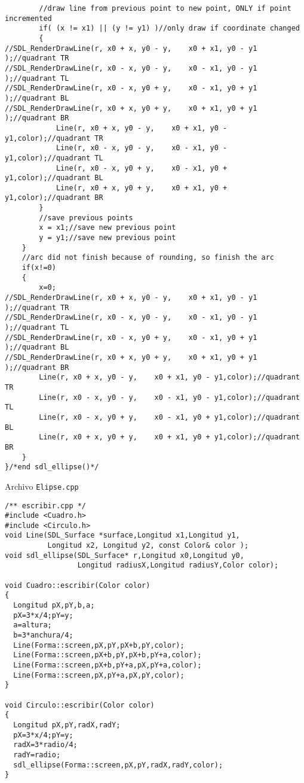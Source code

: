 \documentclass[11pt]{article}
\begin{document}
\begin{verbatim}
        //draw line from previous point to new point, ONLY if point incremented
        if( (x != x1) || (y != y1) )//only draw if coordinate changed
        {
//SDL_RenderDrawLine(r, x0 + x, y0 - y,    x0 + x1, y0 - y1 );//quadrant TR
//SDL_RenderDrawLine(r, x0 - x, y0 - y,    x0 - x1, y0 - y1 );//quadrant TL
//SDL_RenderDrawLine(r, x0 - x, y0 + y,    x0 - x1, y0 + y1 );//quadrant BL
//SDL_RenderDrawLine(r, x0 + x, y0 + y,    x0 + x1, y0 + y1 );//quadrant BR
            Line(r, x0 + x, y0 - y,    x0 + x1, y0 - y1,color);//quadrant TR
            Line(r, x0 - x, y0 - y,    x0 - x1, y0 - y1,color);//quadrant TL
            Line(r, x0 - x, y0 + y,    x0 - x1, y0 + y1,color);//quadrant BL
            Line(r, x0 + x, y0 + y,    x0 + x1, y0 + y1,color);//quadrant BR
        }
        //save previous points
        x = x1;//save new previous point
        y = y1;//save new previous point
    }
    //arc did not finish because of rounding, so finish the arc
    if(x!=0)
    {
        x=0;
//SDL_RenderDrawLine(r, x0 + x, y0 - y,    x0 + x1, y0 - y1 );//quadrant TR
//SDL_RenderDrawLine(r, x0 - x, y0 - y,    x0 - x1, y0 - y1 );//quadrant TL
//SDL_RenderDrawLine(r, x0 - x, y0 + y,    x0 - x1, y0 + y1 );//quadrant BL
//SDL_RenderDrawLine(r, x0 + x, y0 + y,    x0 + x1, y0 + y1 );//quadrant BR
        Line(r, x0 + x, y0 - y,    x0 + x1, y0 - y1,color);//quadrant TR
        Line(r, x0 - x, y0 - y,    x0 - x1, y0 - y1,color);//quadrant TL
        Line(r, x0 - x, y0 + y,    x0 - x1, y0 + y1,color);//quadrant BL
        Line(r, x0 + x, y0 + y,    x0 + x1, y0 + y1,color);//quadrant BR
    }
}/*end sdl_ellipse()*/
\end{verbatim}
\begin{center}
Archivo {\tt Elipse.cpp}
\end{center}
\begin{verbatim}
/** escribir.cpp */
#include <Cuadro.h>
#include <Circulo.h>
void Line(SDL_Surface *surface,Longitud x1,Longitud y1, 
          Longitud x2, Longitud y2, const Color& color );
void sdl_ellipse(SDL_Surface* r,Longitud x0,Longitud y0, 
                 Longitud radiusX,Longitud radiusY,Color color);

void Cuadro::escribir(Color color)
{
  Longitud pX,pY,b,a;
  pX=3*x/4;pY=y;
  a=altura;
  b=3*anchura/4;
  Line(Forma::screen,pX,pY,pX+b,pY,color);
  Line(Forma::screen,pX+b,pY,pX+b,pY+a,color);
  Line(Forma::screen,pX+b,pY+a,pX,pY+a,color);
  Line(Forma::screen,pX,pY+a,pX,pY,color);
}

void Circulo::escribir(Color color)
{
  Longitud pX,pY,radX,radY;
  pX=3*x/4;pY=y;
  radX=3*radio/4;
  radY=radio;
  sdl_ellipse(Forma::screen,pX,pY,radX,radY,color);
}
\end{verbatim}
\end{document}
